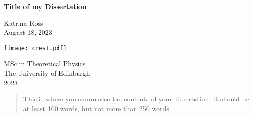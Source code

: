 \documentclass[12pt,a4paper]{report}
\begin{document}
\thispagestyle{empty}

%

\parindent=0pt          %
\parskip=5pt            %


\vspace*{0.1\textheight}

\begin{center}
        \huge{\bfseries Title of my Dissertation}\\ %
\end{center}

\medskip

\begin{center}
        \Large{Katrina Ross}\\  %
        \medskip
        \large{August 18, 2023}  %
\end{center}


\vspace*{0.4\textheight}

\begin{center}
        \texttt{[image: crest.pdf]}
\end{center}

\medskip

\begin{center}

\large{
  MSc in Theoretical Physics\\[0.8ex]
  The University of Edinburgh\\[0.8ex]
  2023}

\end{center}

\newpage



\begin{abstract}
This is where you summarise the contents of your dissertation. It should be
at least 100 words, but not more than 250 words.
\end{abstract}
\end{document}
